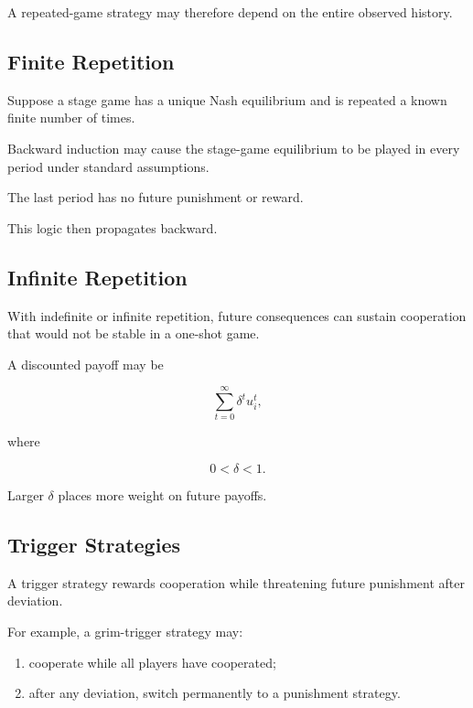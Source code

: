 A repeated-game strategy may therefore depend on the entire observed
history.

\subsection{Finite Repetition}
\label{subsec:finite-repeated-games}

Suppose a stage game has a unique Nash equilibrium and is repeated a known
finite number of times.

Backward induction may cause the stage-game equilibrium to be played in
every period under standard assumptions.

The last period has no future punishment or reward.

This logic then propagates backward.

\subsection{Infinite Repetition}
\label{subsec:infinite-repeated-games}

With indefinite or infinite repetition, future consequences can sustain
cooperation that would not be stable in a one-shot game.

A discounted payoff may be

\[
\boxed{
\sum_{t=0}^{\infty}
\delta^t
u_i^t,
}
\]

where

\[
\boxed{
0<\delta<1.
}
\]

Larger \(\delta\) places more weight on future payoffs.

\subsection{Trigger Strategies}
\label{subsec:trigger-strategies}

A trigger strategy rewards cooperation while threatening future punishment
after deviation.

For example, a grim-trigger strategy may:

\begin{enumerate}
    \item cooperate while all players have cooperated;
    \item after any deviation, switch permanently to a punishment strategy.
\end{enumerate}

